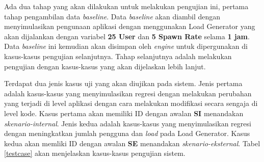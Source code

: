 Ada dua tahap yang akan dilakukan untuk melakukan pengujian ini, pertama tahap pengambilan data \textit{baseline}. Data \textit{baseline} akan diambil dengan menyimulasikan pengunaan aplikasi dengan menggunakan Load Generator yang akan dijalankan dengan variabel \textbf{25 User} dan \textbf{5 Spawn Rate} selama \textbf{1 jam}. Data \textit{baseline} ini kemudian akan disimpan oleh \textit{engine} untuk dipergunakan di kasus-kasus pengujian selanjutnya. Tahap selanjutnya adalah melakukan pengujian dengan kasus-kasus yang akan dijelaskan lebih lanjut.

Terdapat dua jenis kasus uji yang akan diujikan pada sistem. Jenis pertama adalah kasus-kasus yang menyimulasikan regresi dengan melakukan perubahan yang terjadi di level aplikasi dengan cara melakukan modifikasi secara sengaja di level kode. Kasus pertama akan memiliki ID dengan awalan \textbf{SI} menandakan \textit{skenario-internal}. Jenis kedua adalah kasus-kasus yang menyimulasikan regresi dengan meningkatkan jumlah pengguna dan \textit{load} pada Load Generator. Kasus kedua akan memliki ID dengan awalan \textbf{SE} menandakan \textit{skenario-eksternal}. Tabel \ref{testcase} akan menjelaskan kasus-kasus pengujian sistem.

